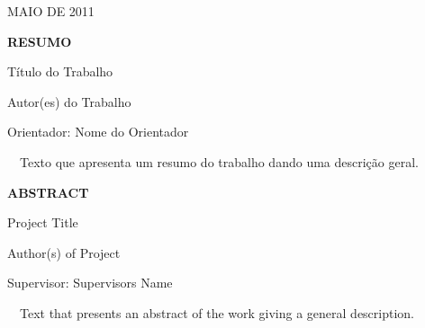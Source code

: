 \begin{titlepage}
\begin{center}
MAIO DE 2011

\end{center}

\bigskip

\clearpage
\bigskip

\begin{center}
\centerline{\textbf{\large RESUMO}}


\bigskip

T\'itulo do Trabalho


\bigskip

Autor(es) do Trabalho


\end{center}
\bigskip


\bigskip


Orientador: Nome do Orientador


\bigskip


\bigskip

\ \ Texto que apresenta um resumo do trabalho dando uma descri\c{c}\~ao geral.


\bigskip

\clearpage
\bigskip

\begin{center}
\centerline{\textbf{\large ABSTRACT}}


\bigskip

Project Title


\bigskip

Author(s) of Project


\end{center}
\bigskip


\bigskip

Supervisor: Supervisor{\textasciiacute}s Name


\bigskip

\ \ Text that presents an abstract of the work giving a general description.


\bigskip


\bigskip


\bigskip
\end{titlepage}
